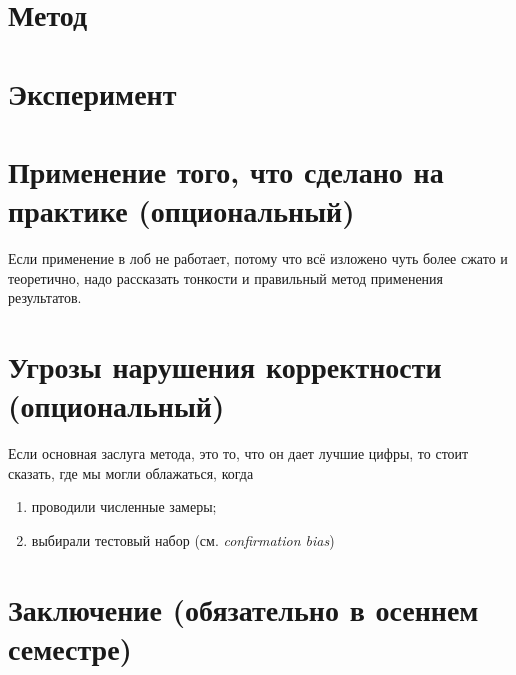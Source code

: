 \section{Метод}



\section{Эксперимент}


\section{Применение того, что сделано на практике (опциональный)}

Если применение в лоб не работает, потому что всё изложено чуть более сжато и теоретично, надо рассказать тонкости и правильный метод применения результатов. 

\section{Угрозы нарушения корректности (опциональный)}

Если основная заслуга метода, это то, что он дает лучшие цифры, то стоит сказать, где мы могли облажаться, когда
\begin{enumerate}
\item проводили численные замеры;
\item выбирали тестовый набор (см. \emph{confirmation bias})
\end{enumerate} 

\section{Заключение (обязательно в осеннем семестре)}



\setmonofont[Mapping=tex-text]{CMU Typewriter Text}
  
  

